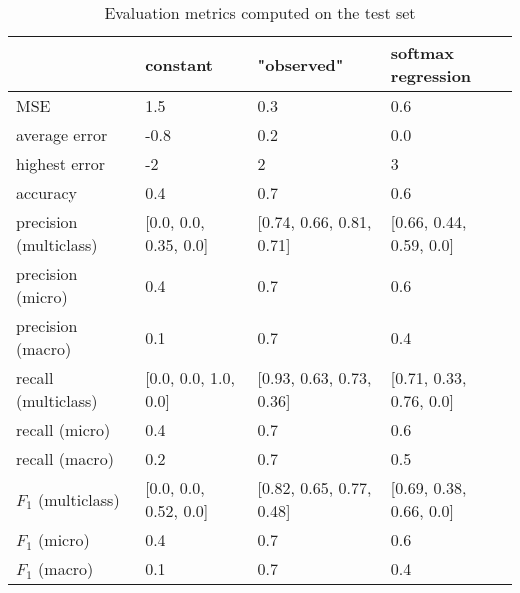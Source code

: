 \begin{table}[H]
\caption{Evaluation metrics computed on the test set}
\label{tbl:sais_eval_test}
\begin{tabular}{llll}
\toprule
 & constant & "observed" & softmax regression \\
\midrule
MSE & 1.5 & 0.3 & 0.6 \\
average error & -0.8 & 0.2 & 0.0 \\
highest error & -2 & 2 & 3 \\
accuracy & 0.4 & 0.7 & 0.6 \\
precision (multiclass) & [0.0, 0.0, 0.35, 0.0] & [0.74, 0.66, 0.81, 0.71] & [0.66, 0.44, 0.59, 0.0] \\
precision (micro) & 0.4 & 0.7 & 0.6 \\
precision (macro) & 0.1 & 0.7 & 0.4 \\
recall (multiclass) & [0.0, 0.0, 1.0, 0.0] & [0.93, 0.63, 0.73, 0.36] & [0.71, 0.33, 0.76, 0.0] \\
recall (micro) & 0.4 & 0.7 & 0.6 \\
recall (macro) & 0.2 & 0.7 & 0.5 \\
$F_1$ (multiclass) & [0.0, 0.0, 0.52, 0.0] & [0.82, 0.65, 0.77, 0.48] & [0.69, 0.38, 0.66, 0.0] \\
$F_1$ (micro) & 0.4 & 0.7 & 0.6 \\
$F_1$ (macro) & 0.1 & 0.7 & 0.4 \\
\bottomrule
\end{tabular}
\end{table}
